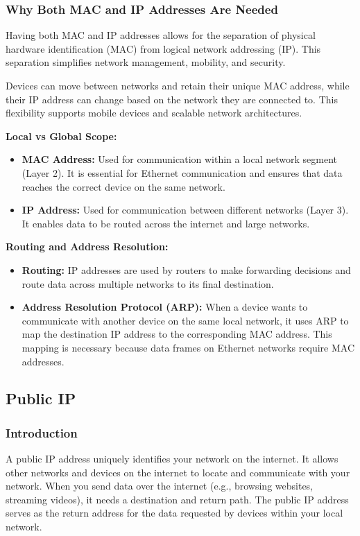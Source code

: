\documentclass{article}
\begin{document}
\subsubsection{Why Both MAC and IP Addresses Are Needed}

Having both MAC and IP addresses allows for the separation of physical hardware identification (MAC) from logical network addressing (IP). This separation simplifies network management, mobility, and security. 

Devices can move between networks and retain their unique MAC address, while their IP address can change based on the network they are connected to. This flexibility supports mobile devices and scalable network architectures.

\textbf{Local vs Global Scope:}
\begin{itemize}
    \item \textbf{MAC Address:} Used for communication within a local network segment (Layer 2). It is essential for Ethernet communication and ensures that data reaches the correct device on the same network.
    \item \textbf{IP Address:} Used for communication between different networks (Layer 3). It enables data to be routed across the internet and large networks.
\end{itemize}

\textbf{Routing and Address Resolution:}

\begin{itemize}
    \item \textbf{Routing:} IP addresses are used by routers to make forwarding decisions and route data across multiple networks to its final destination.
    \item \textbf{Address Resolution Protocol (ARP):} When a device wants to communicate with another device on the same local network, it uses ARP to map the destination IP address to the corresponding MAC address. This mapping is necessary because data frames on Ethernet networks require MAC addresses.
\end{itemize}

\subsection{Public IP}

\subsubsection{Introduction}
A public IP address uniquely identifies your network on the internet. It allows other networks and devices on the internet to locate and communicate with your network. When you send data over the internet (e.g., browsing websites, streaming videos), it needs a destination and return path. The public IP address serves as the return address for the data requested by devices within your local network.
\end{document}
